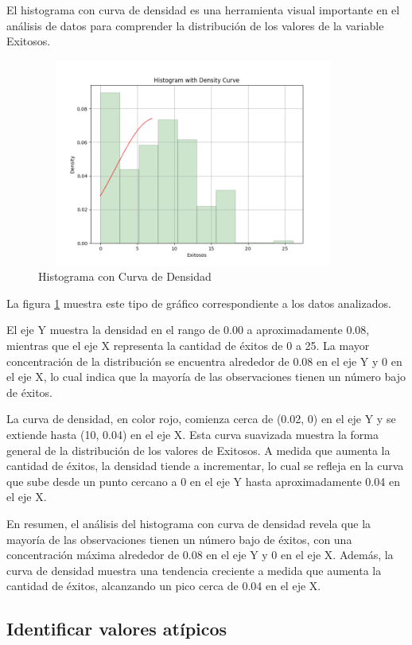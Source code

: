 El histograma con curva de densidad es una herramienta visual importante en el
análisis de datos para comprender la distribución de los valores de la variable
Exitosos.

\begin{figure}[ht]
    \centering
    \includegraphics[width=4.06111in,height=2.68611in]{img/histogramaConCurvaDeDensidad.png}
    \caption{Histograma con Curva de Densidad}
    \label{fig:hist_density}
\end{figure}

La figura \ref{fig:hist_density} muestra este tipo de gráfico correspondiente a
los datos analizados.

El eje Y muestra la densidad en el rango de 0.00 a aproximadamente 0.08,
mientras que el eje X representa la cantidad de éxitos de 0 a 25. La mayor
concentración de la distribución se encuentra alrededor de 0.08 en el eje Y y 0
en el eje X, lo cual indica que la mayoría de las observaciones tienen un
número bajo de éxitos.

La curva de densidad, en color rojo, comienza cerca de (0.02, 0) en el eje Y y
se extiende hasta (10, 0.04) en el eje X. Esta curva suavizada muestra la forma
general de la distribución de los valores de Exitosos. A medida que aumenta la
cantidad de éxitos, la densidad tiende a incrementar, lo cual se refleja en la
curva que sube desde un punto cercano a 0 en el eje Y hasta aproximadamente
0.04 en el eje X.

En resumen, el análisis del histograma con curva de densidad revela que la
mayoría de las observaciones tienen un número bajo de éxitos, con una
concentración máxima alrededor de 0.08 en el eje Y y 0 en el eje X. Además, la
curva de densidad muestra una tendencia creciente a medida que aumenta la
cantidad de éxitos, alcanzando un pico cerca de 0.04 en el eje X.

\subsection{Identificar valores atípicos}

